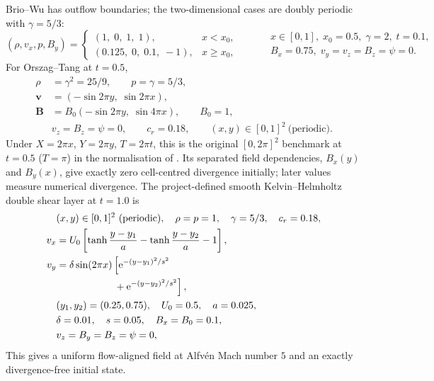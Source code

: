 Brio--Wu \citep{brioWu1988} has outflow boundaries; the two-dimensional cases
are doubly periodic with $\gamma=5/3$:
\begin{equation}
 (\rho,v_x,p,B_y)=
 \begin{cases}
  (1,\;0,\;1,\;1), & x<x_0,\\
  (0.125,\;0,\;0.1,\;-1), & x\ge x_0,
 \end{cases}
 \qquad
 \begin{aligned}
  &x\in[0,1],\; x_0=0.5,\; \gamma=2,\; t=0.1,\\
  &B_x=0.75,\; v_y=v_z=B_z=\psi=0 .
 \end{aligned}
 \label{eq:ch3-ic-briowu}
\end{equation}
For Orszag--Tang at $t=0.5$,
\begin{equation}
 \begin{aligned}
  \rho &= \gamma^{2}=25/9,\qquad p=\gamma=5/3,\\
  \mathbf v &= (-\sin 2\pi y,\;\sin 2\pi x),\\
  \mathbf B &= B_0(-\sin 2\pi y,\;\sin 4\pi x),\qquad B_0=1,\\
  &v_z=B_z=\psi=0,\qquad c_r=0.18,\qquad
  (x,y)\in[0,1]^2\ \text{(periodic)} .
 \end{aligned}
 \label{eq:ch3-ic-ot}
\end{equation}
Under $X=2\pi x$, $Y=2\pi y$, $T=2\pi t$, this is the original
$[0,2\pi]^2$ benchmark at $t=0.5$ ($T=\pi$) \citep{orszagTang1979} in the
normalisation of \citet{toth2000divb}. Its separated field dependencies,
$B_x(y)$ and $B_y(x)$, give exactly zero cell-centred divergence initially;
later values measure numerical divergence. The project-defined smooth
Kelvin--Helmholtz double shear layer at $t=1.0$ is
\begin{align}
 &(x,y)\in[0,1]^2\ \text{(periodic)},\quad
 \rho=p=1,\quad \gamma=5/3,\quad c_r=0.18, \notag\\
 v_x &= U_0\left[\tanh\frac{y-y_1}{a}-\tanh\frac{y-y_2}{a}-1\right], \notag\\
 v_y &= \delta\sin(2\pi x)\left[\mathrm{e}^{-(y-y_1)^2/s^2}\right. \notag\\
     &\hspace{5.6em}\left.{}+\mathrm{e}^{-(y-y_2)^2/s^2}\right], \notag\\
 &(y_1,y_2)=(0.25,0.75),\quad U_0=0.5,\quad a=0.025, \notag\\
 &\delta=0.01,\quad s=0.05,\quad B_x=B_0=0.1, \notag\\
 &v_z=B_y=B_z=\psi=0,
 \label{eq:ch3-ic-kh}
\end{align}
This gives a uniform flow-aligned field at Alfv\'en Mach number $5$ and an
exactly divergence-free initial state.

